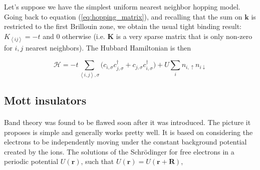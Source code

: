 \documentclass[10pt, twocolumn, twoside]{article}
\begin{document}
Let's suppose we have the simplest uniform nearest neighbor hopping model. Going back to equation (\ref{eq:hopping_matrix}), and recalling that the sum on $\bm k$ is restricted to the first Brillouin zone, we obtain the usual tight binding result: $K_{\left\langle i j \right\rangle} = - t$ and $0$ otherwise (i.e. $\bm K$ is a very sparse matrix that is only non-zero for $i, j$ nearest neighbors). The Hubbard Hamiltonian is then

\begin{equation}\label{eq:hubbard_hamiltonian}
\mathcal{H} = - t \sum_{\left\langle i, j \right\rangle, \sigma} \bigg(c_{i,\sigma} c_{j,\sigma}^\dagger + c_{j,\sigma} c_{i,\sigma}^\dagger \bigg) + U \sum_{i} n_{i,\uparrow} n_{i\downarrow}
\end{equation}

\subsection{Mott insulators}\paragraph{}

Band theory was found to be flawed soon after it was introduced. The picture it proposes is simple and generally works pretty well. It is based on considering the electrons to be independently moving under the constant background potential created by the ions. The solutions of the Schr\"odinger for free electrons in a periodic potential $U(\bm r)$, such that $U(\bm r) = U(\bm r + \bm R)$,
\end{document}
